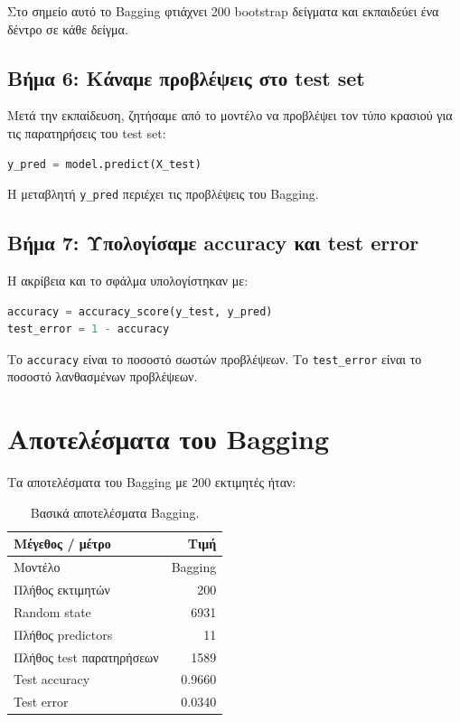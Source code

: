 \documentclass[12pt,a4paper]{article}
\newcommand{\code}[1]{\texttt{\textenglish{#1}}}
\begin{document}
Στο σημείο αυτό το Bagging φτιάχνει 200 bootstrap δείγματα και εκπαιδεύει ένα
δέντρο σε κάθε δείγμα.

\subsection{Βήμα 6: Κάναμε προβλέψεις στο test set}

Μετά την εκπαίδευση, ζητήσαμε από το μοντέλο να προβλέψει τον τύπο κρασιού
για τις παρατηρήσεις του test set:

\begin{lstlisting}[language=Python]
y_pred = model.predict(X_test)
\end{lstlisting}

Η μεταβλητή \code{y\_pred} περιέχει τις προβλέψεις του Bagging.

\subsection{Βήμα 7: Υπολογίσαμε accuracy και test error}

Η ακρίβεια και το σφάλμα υπολογίστηκαν με:

\begin{lstlisting}[language=Python]
accuracy = accuracy_score(y_test, y_pred)
test_error = 1 - accuracy
\end{lstlisting}

Το \code{accuracy} είναι το ποσοστό σωστών προβλέψεων. Το \code{test\_error}
είναι το ποσοστό λανθασμένων προβλέψεων.

\section{Αποτελέσματα του Bagging}

Τα αποτελέσματα του Bagging με 200 εκτιμητές ήταν:

\begin{table}[H]
\centering
\caption{Βασικά αποτελέσματα Bagging.}
\begin{tabular}{lr}
\toprule
\textbf{Μέγεθος / μέτρο} & \textbf{Τιμή} \\
\midrule
Μοντέλο & Bagging \\
Πλήθος εκτιμητών & 200 \\
Random state & 6931 \\
Πλήθος predictors & 11 \\
Πλήθος test παρατηρήσεων & 1589 \\
Test accuracy & 0.9660 \\
Test error & 0.0340 \\
\bottomrule
\end{tabular}
\end{table}
\end{document}
